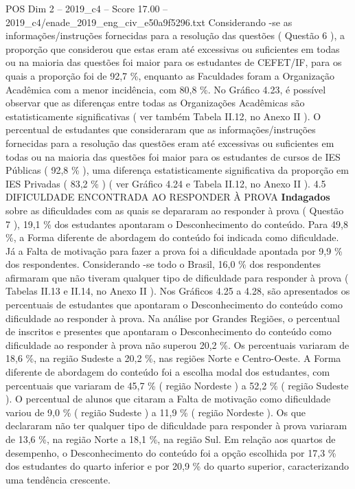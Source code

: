 \begin{textsample}{POS Dim 2 – 2019\_c4 – Score 17.00 – 2019\_c4/enade\_2019\_eng\_civ\_e50a9f5296.txt}
Considerando -se as informações/instruções fornecidas para a resolução das questões ( Questão 6 ), a proporção que considerou que estas eram até excessivas ou suficientes em todas ou na maioria das questões foi maior para os estudantes de CEFET/IF, para os quais a proporção foi de 92,7 \%, enquanto as Faculdades foram a Organização Acadêmica com a menor incidência, com 80,8 \%.
No Gráfico 4.23, é possível observar que as diferenças entre todas as Organizações Acadêmicas são estatisticamente significativas ( ver também Tabela II.12, no Anexo II ).
O percentual de estudantes que consideraram que as informações/instruções fornecidas para a resolução das questões eram até excessivas ou suficientes em todas ou na maioria das questões foi maior para os estudantes de cursos de IES Públicas ( 92,8 \% ), uma diferença estatisticamente significativa da proporção em IES Privadas ( 83,2 \% ) ( ver Gráfico 4.24 e Tabela II.12, no Anexo II ). 4.5 DIFICULDADE ENCONTRADA AO RESPONDER À PROVA \textbf{Indagados} sobre as dificuldades com as quais se depararam ao responder à prova ( Questão 7 ), 19,1 \% dos estudantes apontaram o Desconhecimento do conteúdo.
Para 49,8 \%, a Forma diferente de abordagem do conteúdo foi indicada como dificuldade.
Já a Falta de motivação para fazer a prova foi a dificuldade apontada por 9,9 \% dos respondentes.
Considerando -se todo o Brasil, 16,0 \% dos respondentes afirmaram que não tiveram qualquer tipo de dificuldade para responder à prova ( Tabelas II.13 e II.14, no Anexo II ).
Nos Gráficos 4.25 a 4.28, são apresentados os percentuais de estudantes que apontaram o Desconhecimento do conteúdo como dificuldade ao responder à prova.
Na análise por Grandes Regiões, o percentual de inscritos e presentes que apontaram o Desconhecimento do conteúdo como dificuldade ao responder à prova não superou 20,2 \%.
Os percentuais variaram de 18,6 \%, na região Sudeste a 20,2 \%, nas regiões Norte e Centro-Oeste.
A Forma diferente de abordagem do conteúdo foi a escolha modal dos estudantes, com percentuais que variaram de 45,7 \% ( região Nordeste ) a 52,2 \% ( região Sudeste ).
O percentual de alunos que citaram a Falta de motivação como dificuldade variou de 9,0 \% ( região Sudeste ) a 11,9 \% ( região Nordeste ).
Os que declararam não ter qualquer tipo de dificuldade para responder à prova variaram de 13,6 \%, na região Norte a 18,1 \%, na região Sul.
Em relação aos quartos de desempenho, o Desconhecimento do conteúdo foi a opção escolhida por 17,3 \% dos estudantes do quarto inferior e por 20,9 \% do quarto superior, caracterizando uma tendência crescente.

\end{textsample}
